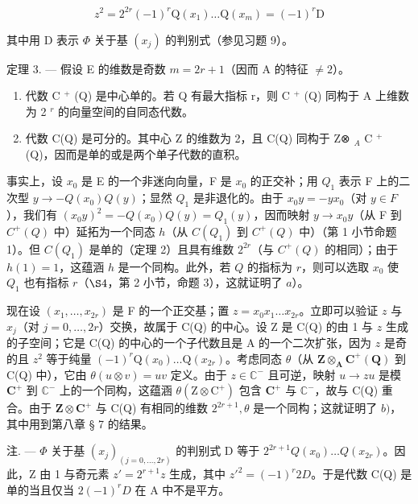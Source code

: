\[
z ^ {2} = 2 ^ {2 r} (- 1) ^ {r} \mathrm{Q} (x _ {1}) \dots \mathrm{Q} (x _ {m}) = (- 1) ^ {r} \mathrm{D}
\]

  其中用 D 表示 \(\Phi\) 关于基 \((x_{j})\) 的判别式（参见习题 9）。

定理 3. --- 假设 E 的维数是奇数 \(m = 2r + 1\)（因而 A 的特征 \(\neq 2\)）。

\begin{enumerate}
\def\labelenumi{\alph{enumi})}
\item
  代数 C \(^{+}\) (Q) 是中心单的。若 Q 有最大指标 r，则 C \(^{+}\) (Q) 同构于 A 上维数为 2 \(^{r}\) 的向量空间的自同态代数。
\item
  代数 C(Q) 是可分的。其中心 Z 的维数为 2，且 C(Q) 同构于 Z⊗ \(_{A}\) C \(^{+}\) (Q)，因而是单的或是两个单子代数的直积。
\end{enumerate}

  事实上，设 \(x_0\) 是 E 的一个非迷向向量，F 是 \(x_0\) 的正交补；用 \(Q_1\) 表示 F 上的二次型 \(y \to -Q(x_0)Q(y)\)；显然 \(Q_1\) 是非退化的。由于 \(x_0y = -yx_0\)（对 \(y \in F\)），我们有 \((x_0y)^2 = -Q(x_0)Q(y) = Q_1(y)\)，因而映射 \(y \to x_0y\)（从 F 到 \(C^+(Q)\) 中）延拓为一个同态 \(h\)（从 \(C(Q_1)\) 到 \(C^+(Q)\) 中）（第 1 小节命题 1）。但 \(C(Q_1)\) 是单的（定理 2）且具有维数 \(2^{2r}\)（与 \(C^{+}(Q)\) 的相同）；由于 \(h(1) = 1\)，这蕴涵 \(h\) 是一个同构。此外，若 \(Q\) 的指标为 \(r\)，则可以选取 \(x_0\) 使 \(Q_1\) 也有指标 \(r\)（\(\S 4\)，第 2 小节，命题 3），这就证明了 \(a\)）。

  现在设 \((x_{1},\ldots ,x_{2r})\) 是 F 的一个正交基；置 \(z = x_0x_1\dots x_{2r}\)。立即可以验证 \(z\) 与 \(x_{j}\)（对 \(j = 0,\dots,2r\)）交换，故属于 C(Q) 的中心。设 Z 是 C(Q) 的由 1 与 \(z\) 生成的子空间；它是 C(Q) 的中心的一个子代数且是 A 的一个二次扩张，因为 \(z\) 是奇的且 \(z^2\) 等于纯量 \((-1)^r\mathrm{Q}(x_0)\ldots \mathrm{Q}(x_{2r})\)。考虑同态 \(\theta\)（从 \(\mathbf{Z}\otimes_{\mathbf{A}}\mathbf{C}^{+}(\mathbf{Q})\) 到 C(Q) 中），它由 \(\theta (u\otimes v) = uv\) 定义。由于 \(z\in \mathbb{C}^{-}\) 且可逆，映射 \(u\to zu\) 是模 \(\mathbf{C}^+\) 到 \(\mathbb{C}^{-}\) 上的一个同构，这蕴涵 \(\theta (\mathrm{Z}\otimes \mathrm{C}^{+})\) 包含 \(\mathbf{C}^{+}\) 与 \(\mathbb{C}^{-}\)，故与 C(Q) 重合。由于 \(\mathbf{Z}\otimes \mathbf{C}^{+}\) 与 C(Q) 有相同的维数 \(2^{2r + 1},\theta\) 是一个同构；这就证明了 \(b)\)，其中用到第八章 § 7 的结果。

注. --- \(\Phi\) 关于基 \((x_{j})_{(j=0,\ldots,2r)}\) 的判别式 D 等于 \(2^{2r+1}Q(x_{0})\ldots Q(x_{2r})\)。因此，Z 由 1 与奇元素 \(z' = 2^{r+1}z\) 生成，其中 \(z'^{2} = (-1)^{r}2D\)。于是代数 C(Q) 是单的当且仅当 \(2(-1)^{r}D\) 在 A 中不是平方。
